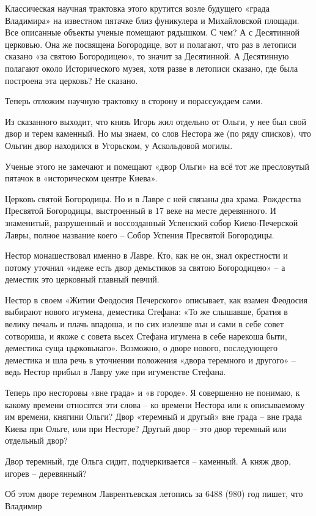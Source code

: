 Классическая научная трактовка этого крутится возле будущего «града Владимира» на известном пятачке близ фуникулера и Михайловской площади. Все описанные объекты ученые помещают рядышком. С чем? А с Десятинной церковью. Она же посвящена Богородице, вот и полагают, что раз в летописи сказано «за святою Богородицею», то значит за Десятинной. А Десятинную полагают около Исторического музея, хотя разве в летописи сказано, где была построена эта церковь? Не сказано.

Теперь отложим научную трактовку в сторону и порассуждаем сами.

Из сказанного выходит, что князь Игорь жил отдельно от Ольги, у нее был свой двор и терем каменный. Но мы знаем, со слов Нестора же (по ряду списков), что Ольгин двор находился в Угорьском, у Аскольдовой могилы.

Ученые этого не замечают и помещают «двор Ольги» на всё тот же пресловутый пятачок в «историческом центре Киева».

Церковь святой Богородицы. Но и в Лавре с ней связаны два храма. Рождества Пресвятой Богородицы, выстроенный в 17 веке на месте деревянного. И знаменитый, разрушенный и воссозданный Успенский собор Киево-Печерской Лавры, полное название коего – Собор Успения Пресвятой Богородицы.

Нестор монашествовал именно в Лавре. Кто, как не он, знал окрестности и потому уточнил «идеже есть двор демьстиков за святою Богородицею» – а деместик это церковный главный певчий.

Нестор в своем «Житии Феодосия Печерского» описывает, как взамен Феодосия выбирают нового игумена, деместика Стефана: «То же слышавше, братия в велику печаль и плачь впадоша, и по сих излезше вън и сами в себе совет сотвориша, и якоже с совета вьсех Стефана игумена в себе нарекоша быти, деместика суща цьрковьнаго». Возможно, о дворе нового, последующего деместика и шла речь в уточнении положения «двора теремного и другого» – ведь Нестор прибыл в Лавру уже при игуменстве Стефана.

Теперь про несторовы «вне града» и «в городе». Я совершенно не понимаю, к какому времени относятся эти слова – ко времени Нестора или к описываемому им времени, княгини Ольги? Двор «теремный и другый» вне града – вне града Киева при Ольге, или при Несторе? Другый двор – это двор теремный или отдельный двор?

Двор теремный, где Ольга сидит, подчеркивается – каменный. А княж двор, игорев – деревянный?

Об этом дворе теремном Лаврентьевская летопись за 6488 (980) год пишет, что Владимир 

